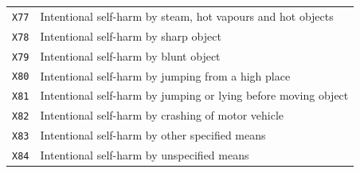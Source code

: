 \begin{longtable}{p{2.2cm} p{10.3cm}}
\texttt{X77} & Intentional self-harm by steam, hot vapours and hot objects \\
\texttt{X78} & Intentional self-harm by sharp object \\
\texttt{X79} & Intentional self-harm by blunt object \\
\texttt{X80} & Intentional self-harm by jumping from a high place \\
\texttt{X81} & Intentional self-harm by jumping or lying before moving object \\
\texttt{X82} & Intentional self-harm by crashing of motor vehicle \\
\texttt{X83} & Intentional self-harm by other specified means \\
\texttt{X84} & Intentional self-harm by unspecified means \\[6pt]


\end{longtable}
